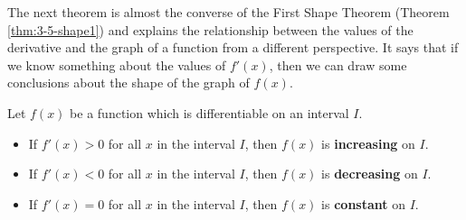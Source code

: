 The next theorem is almost the converse of the First Shape Theorem (Theorem \ref{thm:3-5-shape1}) and explains the relationship between the values of the derivative and the graph of a function from a different perspective. It says that if we know something about the values of $f'(x)$, then we can draw some conclusions about the shape of the graph of $f(x)$.

\begin{theorem}
Let $f(x)$ be a function which is differentiable on an interval $I$.
    \begin{itemize}
    \item If $f'(x)>0$ for all $x$ in the interval $I$, then $f(x)$ is {\bf increasing} on $I$.
    \item If $f'(x)<0$ for all $x$ in the interval $I$, then $f(x)$ is {\bf decreasing} on $I$.
    \item If $f'(x)=0$ for all $x$ in the interval $I$, then $f(x)$ is {\bf constant} on $I$.
    \end{itemize}
\end{theorem}
